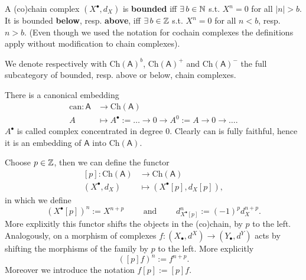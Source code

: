 \begin{defn}
	A (co)chain complex $\left(X^{\bullet}, d_X\right)$ is \textbf{bounded} iff
	$\exists\, b \in \mathbb{N}$ s.t. $X^n = 0$ for all $\left| n \right| > b$.
	It is bounded \textbf{below}, resp. \textbf{above}, iff
	$\exists\, b \in \mathbb{Z}$ s.t. $X^n = 0$ for all
	$n < b$, resp. $n > b$.
	(Even though we used the notation for cochain complexes the definitions apply without
	modification to chain complexes).

	We denote respectively with $\mathrm{Ch}(\mathsf{A})^b$, $\mathrm{Ch}(\mathsf{A})^+$
	and $\mathrm{Ch}(\mathsf{A})^-$ the full subcategory of bounded, resp. above or below, chain complexes.
\end{defn}

\begin{defn}
	There is a canonical embedding
	\begin{align}
		\mathrm{can}: \mathsf{A} &\to \mathrm{Ch}(\mathsf{A}) \\
		A &\mapsto A^{\bullet} := 
		\ldots \to 0 \to A^0 := A \to 0 \to \ldots
	.\end{align} 
	$A^{\bullet}$ is called complex concentrated in degree $0$.
	Clearly $\mathrm{can}$ is fully faithful, hence it is an embedding of $\mathsf{A}$ into $\mathrm{Ch}(\mathsf{A})$.
\end{defn}

\begin{defn}
	Choose $p \in \mathbb{Z}$, then we can define the functor
	\begin{align}
		\left[ p \right]: \mathrm{Ch}(\mathsf{A}) &\to \mathrm{Ch}(\mathsf{A}) \\
		\left(X^{\bullet}, d_X\right) &\mapsto \left( X^{\bullet}[p], d_{X}[p] \right)
	,\end{align} 
	in which we define
	\begin{equation}
		\left( X^{\bullet} [p] \right)^n := X^{n+p} \qquad \text{ and } \qquad
		d^n_{X^{\bullet}[p]} := (-1)^{p} d_X^{n+p}
	.\end{equation} 
	More explixitly this functor shifts the objects in the (co)chain, by $p$ to the left.
	Analogously, on a morphism of complexes $f: \left( X_{\bullet}, d^{X} \right) \to \left( Y_{\bullet}, d^{Y} \right)$
	acts by shifting the morphisms of the family by $p$ to the left.
	More explicitly
	\begin{equation}
		\left( [p]f \right)^n := f^{n+p}
	.\end{equation} 
	Moreover we introduce the notation $f[p] := [p]f$.
\end{defn}

